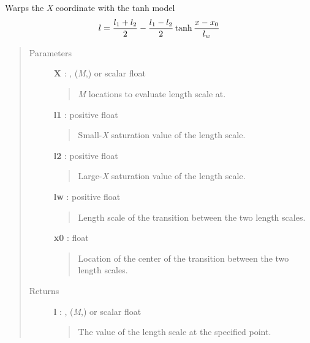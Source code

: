 \documentclass[letterpaper,10pt,english]{sphinxmanual}
\begin{document}
\begin{fulllineitems}
\label{gptools.kernel:gptools.kernel.gibbs.tanh_warp}
Warps the \emph{X} coordinate with the tanh model
\begin{gather}
\begin{split}l = \frac{l_1 + l_2}{2} - \frac{l_1 - l_2}{2}\tanh\frac{x-x_0}{l_w}\end{split}\notag
\end{gather}\begin{quote}\begin{description}
\item[{Parameters }] \leavevmode
\textbf{X} : , (\emph{M},) or scalar float
\begin{quote}

\emph{M} locations to evaluate length scale at.
\end{quote}

\textbf{l1} : positive float
\begin{quote}

Small-\emph{X} saturation value of the length scale.
\end{quote}

\textbf{l2} : positive float
\begin{quote}

Large-\emph{X} saturation value of the length scale.
\end{quote}

\textbf{lw} : positive float
\begin{quote}

Length scale of the transition between the two length scales.
\end{quote}

\textbf{x0} : float
\begin{quote}

Location of the center of the transition between the two length scales.
\end{quote}

\item[{Returns }] \leavevmode
\textbf{l} : , (\emph{M},) or scalar float
\begin{quote}

The value of the length scale at the specified point.
\end{quote}

\end{description}\end{quote}

\end{fulllineitems}
\end{document}
